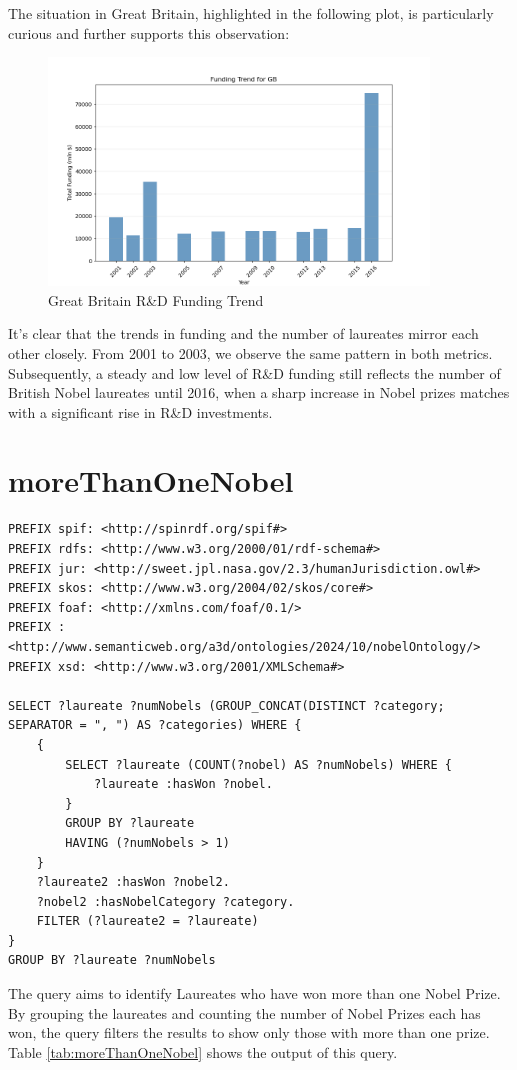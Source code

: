 \documentclass{article}
\begin{document}
The situation in Great Britain, highlighted in the following plot, is particularly curious and further supports this observation:

\begin{figure}[h!]
	\centering
	\includegraphics[width=0.9\textwidth]{../queries/plots/gb_funding_trend_bar.png}
	\caption{Great Britain R\&D Funding Trend}
\end{figure}

It's clear that the trends in funding and the number of laureates mirror each other closely. From 2001 to 2003, we observe the same pattern in both metrics. Subsequently, a steady and low level of R\&D funding still reflects the number of British Nobel laureates until 2016, when a sharp increase in Nobel prizes matches with a significant rise in R\&D investments.

\section{moreThanOneNobel}

\begin{lstlisting}
PREFIX spif: <http://spinrdf.org/spif#>
PREFIX rdfs: <http://www.w3.org/2000/01/rdf-schema#>
PREFIX jur: <http://sweet.jpl.nasa.gov/2.3/humanJurisdiction.owl#>
PREFIX skos: <http://www.w3.org/2004/02/skos/core#>
PREFIX foaf: <http://xmlns.com/foaf/0.1/>
PREFIX : <http://www.semanticweb.org/a3d/ontologies/2024/10/nobelOntology/>
PREFIX xsd: <http://www.w3.org/2001/XMLSchema#>

SELECT ?laureate ?numNobels (GROUP_CONCAT(DISTINCT ?category; SEPARATOR = ", ") AS ?categories) WHERE {
    {
        SELECT ?laureate (COUNT(?nobel) AS ?numNobels) WHERE {
            ?laureate :hasWon ?nobel.
        }
        GROUP BY ?laureate
        HAVING (?numNobels > 1)
    }
    ?laureate2 :hasWon ?nobel2.
    ?nobel2 :hasNobelCategory ?category.
    FILTER (?laureate2 = ?laureate)
}
GROUP BY ?laureate ?numNobels
\end{lstlisting}
The query aims to identify Laureates who have won more than one Nobel Prize. By grouping the laureates and counting the number of Nobel Prizes each has won, the query filters the results to show only those with more than one prize.
Table \ref{tab:moreThanOneNobel} shows the output of this query.
\end{document}
